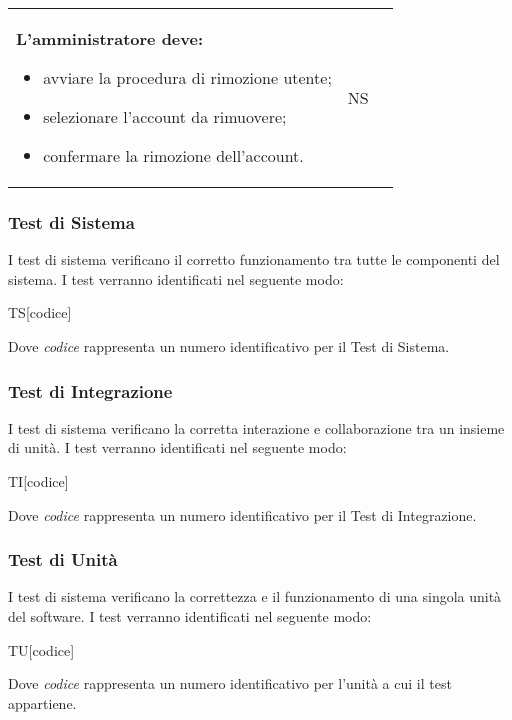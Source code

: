 \documentclass[../piano-di-qualifica.tex]{subfiles}
\begin{document}
\begin{longtable}[H]{>{\centering\bfseries}m{3cm} >{}m{11cm} >{\centering\arraybackslash}m{2cm}}
  L'amministratore deve:
  \begin{itemize}
    \item avviare la procedura di rimozione utente;
    \item selezionare l'account da rimuovere;
    \item confermare la rimozione dell'account.
  \end{itemize}
                                  & NS                                                                                                                                                                                                                                   \\
\end{longtable}

\subsubsection{Test di Sistema}%
\label{subs:sistema}
I test di sistema verificano il corretto funzionamento tra tutte le componenti del sistema. I test verranno identificati nel seguente modo:
\begin{center}
  TS[codice]
\end{center}
Dove \textit{codice} rappresenta un numero identificativo per il Test di Sistema.
\subsubsection{Test di Integrazione}%
\label{subs:integrazione}
I test di sistema verificano la corretta interazione e collaborazione tra un insieme di unità. I test verranno identificati nel seguente modo:
\begin{center}
  TI[codice]
\end{center}
Dove \textit{codice} rappresenta un numero identificativo per il Test di Integrazione.
\subsubsection{Test di Unità}%
\label{subs:unita}
I test di sistema verificano la correttezza e il funzionamento di una singola unità del software. I test verranno identificati nel seguente modo:
\begin{center}
  TU[codice]
\end{center}
Dove \textit{codice} rappresenta un numero identificativo per l'unità a cui il test appartiene.
\end{document}
